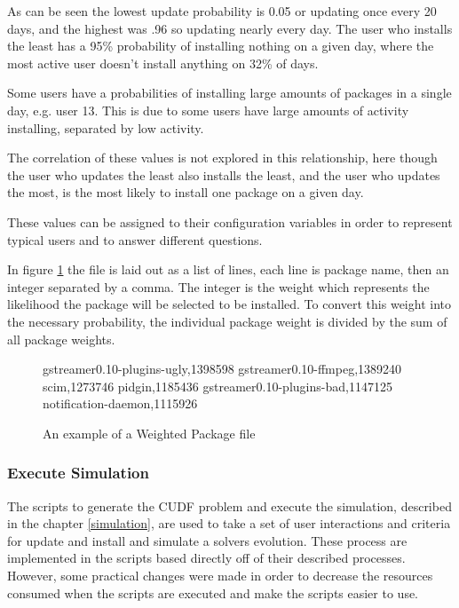 As can be seen the lowest update probability is 0.05 or updating once every 20 days, and the highest was .96 so updating nearly every day.
The user who installs the least has a 95\% probability of installing nothing on a given day, where the most active user doesn't install anything on 32\% of days.

Some users have a probabilities of installing large amounts of packages in a single day, e.g. user 13.
This is due to some users have large amounts of activity installing, separated by low activity.

The correlation of these values is not explored in this relationship, here though the user who updates the least also installs the least,
and the user who updates the most, is the most likely to install one package on a given day.

These values can be assigned to their configuration variables in order to represent typical users and to answer different questions.


In figure \ref{packageprob} the file is laid out as a list of lines, each line is package name, then an integer separated by a comma.
The integer is the weight which represents the likelihood the package will be selected to be installed.
To convert this weight into the necessary probability, the individual package weight is divided by the sum of all package weights. 

\begin{figure}[htp]
\begin{center}
gstreamer0.10-plugins-ugly,1398598
gstreamer0.10-ffmpeg,1389240
scim,1273746
pidgin,1185436
gstreamer0.10-plugins-bad,1147125
notification-daemon,1115926
\caption[Weighted Package File Example]{An example of a Weighted Package file }
\label{packageprob}
\end{center}
\end{figure}

\subsubsection{Execute Simulation}
The scripts to generate the CUDF problem and execute the simulation, described in the chapter \ref{simulation}, 
are used to take a set of user interactions and criteria for update and install and simulate a solvers evolution.
These process are implemented in the scripts based directly off of their described processes. 
However, some practical changes were made in order to decrease the resources consumed when the scripts are executed and make the scripts easier to use.

